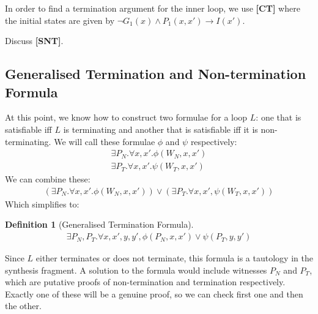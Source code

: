 \documentclass[preprint]{sigplanconf}
\theoremstyle{definition}
\newtheorem{definition}[theorem]{Definition}
\begin{document}
In order to find a termination argument for the inner loop, we use {\bf [CT]} where the initial states are given by 
$\neg G_1(x) \wedge P_1(x,x') \rightarrow I(x')$.


Discuss {\bf [SNT]}.\\

\fi

\subsection{Generalised Termination and Non-termination Formula}
At this point, we know how to construct two formulae for a loop $L$: one that is
satisfiable iff $L$ is terminating and another that is
satisfiable iff it is non-terminating.  We will call these formulae $\phi$ and $\psi$
respectively:
\begin{align*}
 \exists P_N . \forall x, x' . \phi(W_N, x, x') \\
 \exists P_T . \forall x, x' . \psi(W_T, x, x')
\end{align*}
We can combine these:
\begin{align*}
 (\exists P_N . \forall x, x'. \phi(W_N, x, x')) \vee (\exists P_T . \forall x, x', \psi(W_T, x, x'))
\end{align*}
Which simplifies to:
\begin{definition}[Generalised Termination Formula]
\begin{align*}
 \exists P_N, P_T. \forall x, x', y, y', \phi(P_N, x, x') \vee \psi(P_T, y, y') 
\end{align*}
\end{definition}


Since $L$ either terminates or does not terminate, this formula is a tautology in the synthesis fragment.
A solution to the formula would include witnesses $P_N$ and $P_T$, which are putative proofs of non-termination
and termination respectively.  Exactly one of these will be a genuine proof, so we can check
first one and then the other.

% 
% 
\end{document}
